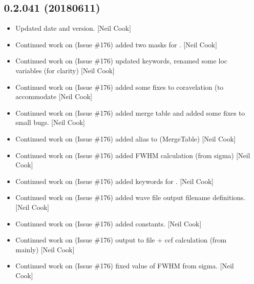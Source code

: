 \documentclass[a4paper,10pt,english]{report}
\begin{document}
\subsection{0.2.041 (2018\sphinxhyphen{}06\sphinxhyphen{}11)}
\label{\detokenize{misc/changelog:id443}}\begin{itemize}
\item {} 
Updated date and version. {[}Neil Cook{]}

\item {} 
Continued work on  (Issue \#176) \sphinxhyphen{} added two masks for .
{[}Neil Cook{]}

\item {} 
Continued work on  (Issue \#176) \sphinxhyphen{} updated keywords, renamed some
loc variables (for clarity) {[}Neil Cook{]}

\item {} 
Continued work on  (Issue \#176) \sphinxhyphen{} added some fixes to
coravelation (to accommodate  {[}Neil Cook{]}

\item {} 
Continued work on  (Issue \#176) \sphinxhyphen{} added merge table and added
some fixes to small bugs. {[}Neil Cook{]}

\item {} 
Continued work on  (Issue \#176) \sphinxhyphen{} added alias to
 (MergeTable) {[}Neil Cook{]}

\item {} 
Continued work on  (Issue \#176) \sphinxhyphen{} added FWHM calculation (from
sigma) {[}Neil Cook{]}

\item {} 
Continued work on  (Issue \#176) \sphinxhyphen{} added keywords for .
{[}Neil Cook{]}

\item {} 
Continued work on  (Issue \#176) \sphinxhyphen{} added wave file output
filename definitions. {[}Neil Cook{]}

\item {} 
Continued work on  (Issue \#176) \sphinxhyphen{} added constants. {[}Neil Cook{]}

\item {} 
Continued work on  (Issue \#176) \sphinxhyphen{} output to file + ccf
calculation (from  mainly) {[}Neil Cook{]}

\item {} 
Continued work on  (Issue \#176) \sphinxhyphen{} fixed value of FWHM from
sigma. {[}Neil Cook{]}

\end{itemize}
\end{document}
